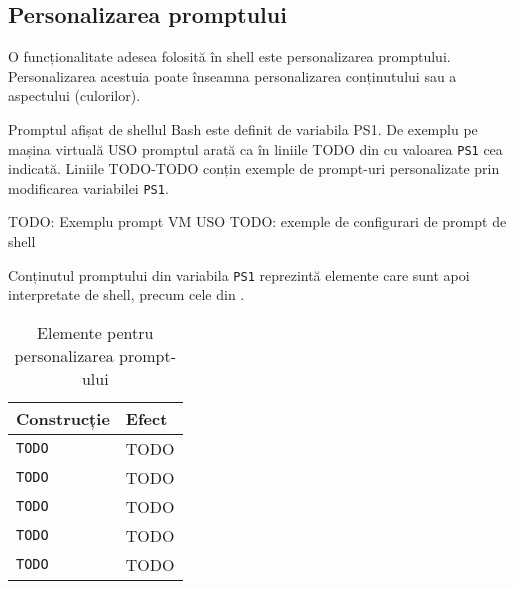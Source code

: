 \subsection{Personalizarea promptului}
\label{sec:cli-prompt}

O funcționalitate adesea folosită în shell este personalizarea promptului.
Personalizarea acestuia poate înseamna personalizarea conținutului sau a
aspectului (culorilor).

Promptul afișat de shellul Bash este definit de variabila PS1. De exemplu pe
mașina virtuală USO promptul arată ca în liniile TODO din  cu valoarea \texttt{PS1} cea indicată. Liniile TODO-TODO conțin exemple de prompt-uri personalizate prin modificarea variabilei \texttt{PS1}.

\begin{screen}[caption={Personalizarea prompt-ului},label={lst:cli:custom-prompt}]
TODO: Exemplu prompt VM USO
TODO: exemple de configurari de prompt de shell
\end{screen}

Conținutul promptului din variabila \texttt{PS1} reprezintă elemente care sunt apoi
interpretate de shell, precum cele din .

\begin{table}[!htb]
  \caption{Elemente pentru personalizarea prompt-ului}
  \begin{center}
    \begin{tabular}{ p{} p{} }
      \toprule
        \textbf{Construcție} &
        \textbf{Efect} \\
      \midrule

        \texttt{TODO} &
        TODO \\

        \texttt{TODO} &
        TODO \\

        \texttt{TODO} &
        TODO \\

        \texttt{TODO} &
        TODO \\

        \texttt{TODO} &
        TODO \\

      \bottomrule
    \end{tabular}
    \label{tab:cli:prompt}
  \end{center}
\end{table}

